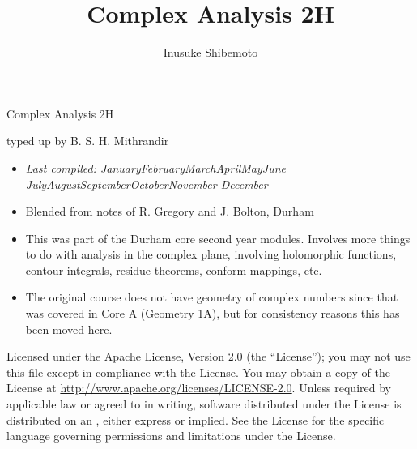\documentclass[letter-paper]{tufte-book}
\title{Complex Analysis 2H}
\author[]{Inusuke Shibemoto}
\newcommand{\monthyear}{%
  \ifcase\month\or January\or February\or March\or April\or May\or June\or
  July\or August\or September\or October\or November\or
  December\fi\space\number\year
}
\begin{document}



\chapter*{}

\begin{fullwidth}

\par \begin{center}{\Huge Complex Analysis 2H}\end{center}

\vspace*{5mm}

\par \begin{center}{\Large typed up by B. S. H. Mithrandir}\end{center}

\vspace*{5mm}

\begin{itemize}
  \item \textit{Last compiled: \monthyear}
  \item Blended from notes of R. Gregory and J. Bolton, Durham
  \item This was part of the Durham core second year modules. Involves more
  things to do with analysis in the complex plane, involving holomorphic
  functions, contour integrals, residue theorems, conform mappings, etc.
  \item The original course does not have geometry of complex numbers since that
  was covered in Core A (Geometry 1A), but for consistency reasons this has been
  moved here.
\end{itemize}

\par

\par Licensed under the Apache License, Version 2.0 (the ``License''); you may not
use this file except in compliance with the License. You may obtain a copy
of the License at \url{http://www.apache.org/licenses/LICENSE-2.0}. Unless
required by applicable law or agreed to in writing, software distributed
under the License is distributed on an , either express or implied. See the
License for the specific language governing permissions and limitations
under the License.
\end{fullwidth}
\end{document}
